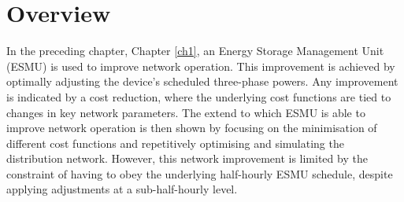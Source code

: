 \section{Overview}
\label{ch2:sec:overview}



In the preceding chapter, Chapter \ref{ch1}, an Energy Storage Management Unit (ESMU) is used to improve network operation.
This improvement is achieved by optimally adjusting the device's scheduled three-phase powers.
Any improvement is indicated by a cost reduction, where the underlying cost functions are tied to changes in key network parameters.
The extend to which ESMU is able to improve network operation is then shown by focusing on the minimisation of different cost functions and repetitively optimising and simulating the distribution network.
However, this network improvement is limited by the constraint of having to obey the underlying half-hourly ESMU schedule, despite applying adjustments at a sub-half-hourly level.

